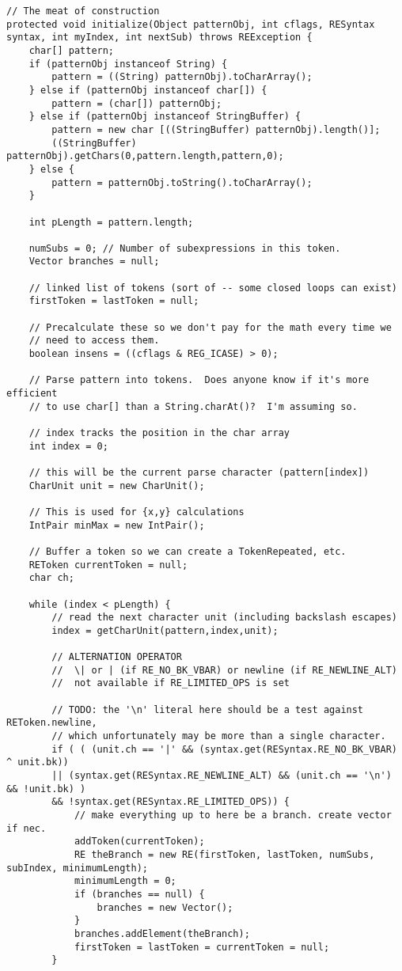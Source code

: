 \begin{mdframed}
\begin{lstlisting}
// The meat of construction
protected void initialize(Object patternObj, int cflags, RESyntax syntax, int myIndex, int nextSub) throws REException {
	char[] pattern;
	if (patternObj instanceof String) {
		pattern = ((String) patternObj).toCharArray();
	} else if (patternObj instanceof char[]) {
		pattern = (char[]) patternObj;
	} else if (patternObj instanceof StringBuffer) {
		pattern = new char [((StringBuffer) patternObj).length()];
		((StringBuffer) patternObj).getChars(0,pattern.length,pattern,0);
	} else {
		pattern = patternObj.toString().toCharArray();
	}
	
	int pLength = pattern.length;
	
	numSubs = 0; // Number of subexpressions in this token.
	Vector branches = null;
	
	// linked list of tokens (sort of -- some closed loops can exist)
	firstToken = lastToken = null;
	
	// Precalculate these so we don't pay for the math every time we
	// need to access them.
	boolean insens = ((cflags & REG_ICASE) > 0);
	
	// Parse pattern into tokens.  Does anyone know if it's more efficient
	// to use char[] than a String.charAt()?  I'm assuming so.
	
	// index tracks the position in the char array
	int index = 0;
	
	// this will be the current parse character (pattern[index])
	CharUnit unit = new CharUnit();
	
	// This is used for {x,y} calculations
	IntPair minMax = new IntPair();
	
	// Buffer a token so we can create a TokenRepeated, etc.
	REToken currentToken = null;
	char ch;
	
	while (index < pLength) {
		// read the next character unit (including backslash escapes)
		index = getCharUnit(pattern,index,unit);
		
		// ALTERNATION OPERATOR
		//  \| or | (if RE_NO_BK_VBAR) or newline (if RE_NEWLINE_ALT)
		//  not available if RE_LIMITED_OPS is set
		
		// TODO: the '\n' literal here should be a test against REToken.newline,
		// which unfortunately may be more than a single character.
		if ( ( (unit.ch == '|' && (syntax.get(RESyntax.RE_NO_BK_VBAR) ^ unit.bk))
		|| (syntax.get(RESyntax.RE_NEWLINE_ALT) && (unit.ch == '\n') && !unit.bk) )
		&& !syntax.get(RESyntax.RE_LIMITED_OPS)) {
			// make everything up to here be a branch. create vector if nec.
			addToken(currentToken);
			RE theBranch = new RE(firstToken, lastToken, numSubs, subIndex, minimumLength);
			minimumLength = 0;
			if (branches == null) {
				branches = new Vector();
			}
			branches.addElement(theBranch);
			firstToken = lastToken = currentToken = null;
		}
		

\end{lstlisting}
\end{mdframed}

